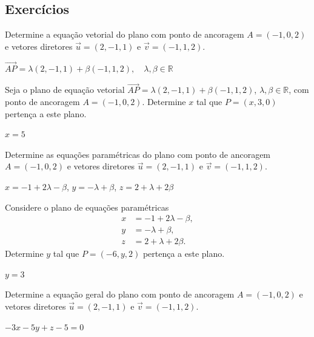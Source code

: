 \subsection*{Exercícios}

\begin{exer}
  Determine a equação vetorial do plano com ponto de ancoragem $A=(-1,0,2)$ e vetores diretores $\vec{u}=(2,-1,1)$ e $\vec{v}=(-1,1,2)$.
\end{exer}
\begin{resp}
  $\overrightarrow{AP}=\lambda(2,-1,1)+\beta(-1,1,2),\quad\lambda,\beta\in\mathbb{R}$
\end{resp}

\begin{exer}
  Seja o plano de equação vetorial $\overrightarrow{AP}=\lambda(2,-1,1)+\beta(-1,1,2)$, $\lambda,\beta\in\mathbb{R}$, com ponto de ancoragem $A=(-1,0,2)$. Determine $x$ tal que $P=(x,3,0)$ pertença a este plano.
\end{exer}
\begin{resp}
  $x=5$
\end{resp}

\begin{exer}
  Determine as equações paramétricas do plano com ponto de ancoragem $A=(-1,0,2)$ e vetores diretores $\vec{u}=(2,-1,1)$ e $\vec{v}=(-1,1,2)$.
\end{exer}
\begin{resp}
  $x=-1+2\lambda - \beta$, $y=-\lambda+\beta$, $z=2+\lambda+2\beta$
\end{resp}

\begin{exer}
  Considere o plano de equações paramétricas
  \begin{align}
    x &= -1+2\lambda - \beta,\\
    y &= -\lambda+\beta,\\
    z &= 2+\lambda+2\beta.
  \end{align}
  Determine $y$ tal que $P=(-6,y,2)$ pertença a este plano.
\end{exer}
\begin{resp}
  $y=3$
\end{resp}

\begin{exer}
  Determine a equação geral do plano com ponto de ancoragem $A=(-1,0,2)$ e vetores diretores $\vec{u}=(2,-1,1)$ e $\vec{v}=(-1,1,2)$.
\end{exer}
\begin{resp}
  $-3x -5y + z - 5 = 0$
\end{resp}

